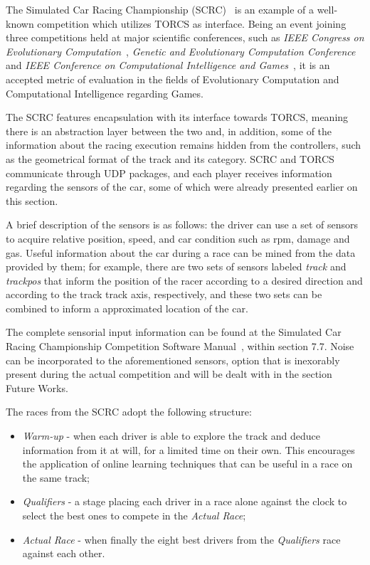 	The Simulated Car Racing Championship (SCRC)~\cite{SCR} is an example of a well-known competition which utilizes
	TORCS as interface. Being an event joining three competitions held at major scientific conferences, such as
	\emph{IEEE Congress on Evolutionary Computation}~\cite{CEC}, \emph{Genetic and Evolutionary Computation
	Conference}~\cite{GECCO} and \emph{IEEE Conference on Computational Intelligence and Games}~\cite{CIG}, it is
	an accepted	metric of evaluation in the fields of Evolutionary Computation and Computational Intelligence
	regarding Games.
	
	The SCRC features encapsulation with its interface towards TORCS, meaning there is an abstraction layer between
	the two and, in addition, some of the information about the racing execution remains hidden from the controllers,
	such as the geometrical format of the track and its category. SCRC and TORCS communicate through UDP packages,
	and each player receives information regarding the sensors of the car, some of which were already presented
	earlier on this section.
	
	A brief description of the sensors is as follows: the driver can use a set of sensors to acquire relative
	position, speed, and car condition such as rpm, damage and gas. Useful information about the car during a
	race can be mined from the data provided by them; for example, there are two sets of sensors labeled
	\emph{track} and \emph{trackpos} that inform the position of the racer according to a desired direction and
	according to the track track axis, respectively, and these two sets can be combined to inform a approximated
	location of the car.
	
	The complete sensorial input information can be found at the Simulated Car Racing Championship Competition
	Software Manual~\cite{SCRC}, within section 7.7. Noise can be incorporated to the aforementioned sensors,
	option that is inexorably present during the actual competition and will be dealt with in the section Future
	Works.

	The races from the SCRC adopt the following structure:
		\begin{itemize}
			
			\item \emph{Warm-up} - when each driver is able to explore the track and deduce information from it	at
			will, for a limited time on their own. This encourages the application of online learning techniques
			that can be useful in a race on the same track;
			
			\item \emph{Qualifiers} - a stage placing each driver in a race alone against the clock to select the best
			ones to compete in the \emph{Actual Race};
			
			\item \emph{Actual Race} - when finally the eight best drivers from the \emph{Qualifiers} race against
			each other.
			
		\end{itemize}
	
